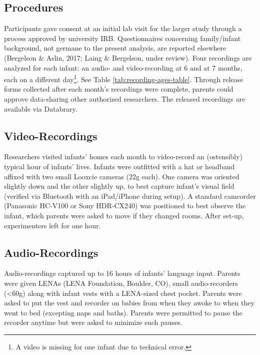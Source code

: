 \documentclass[man]{apa6}
\theoremstyle{definition}
\theoremstyle{definition}
\theoremstyle{definition}
\theoremstyle{remark}
\begin{document}
\subsection{Procedures}\label{procedures}

Participants gave consent at an initial lab visit for the larger study
through a process approved by university IRB. Questionnaires concerning
family/infant background, not germane to the present analysis, are
reported elsewhere (Bergelson \& Aslin, 2017; Laing \& Bergelson, under
review). Four recordings are analyzed for each infant: an audio- and
video-recording at 6 and at 7 months, each on a different
day\footnote{A video is missing for one infant due to technical error.}.
See Table \ref{tab:recording-ages-table}. Through release forms
collected after each month's recordings were complete, parents could
approve data-sharing other authorized researchers. The released
recordings are available via Databrary.

\subsection{Video-Recordings}\label{video-recordings}

Researchers visited infants' homes each month to video-record an
(ostensibly) typical hour of infants' lives. Infants were outfitted with
a hat or headband affixed with two small Looxcie cameras (22g each). One
camera was oriented slightly down and the other slightly up, to best
capture infant's visual field (verified via Bluetooth with an
iPad/iPhone during setup). A standard camcorder (Panasonic HC-V100 or
Sony HDR-CX240) was positioned to best observe the infant, which parents
were asked to move if they changed rooms. After set-up, experimenters
left for one hour.

\subsection{Audio-Recordings}\label{audio-recordings}

Audio-recordings captured up to 16 hours of infants' language input.
Parents were given LENAs (LENA Foundation, Boulder, CO), small
audio-recorders (\textless{}60g) along with infant vests with a
LENA-sized chest pocket. Parents were asked to put the vest and recorder
on babies from when they awoke to when they went to bed (excepting naps
and baths). Parents were permitted to pause the recorder anytime but
were asked to minimize such pauses.
\end{document}
